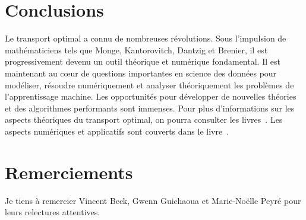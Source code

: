 \section*{Conclusions}

Le transport optimal a connu de nombreuses révolutions. Sous l'impulsion de mathématiciens tels que Monge, Kantorovitch, Dantzig et Brenier, il est progressivement devenu un outil théorique et numérique fondamental. 
%
Il est maintenant au c\oe{}ur de questions importantes en science des données pour modéliser, résoudre numériquement et analyser théoriquement les problèmes de l'apprentissage machine. Les opportunités pour développer de nouvelles théories et des algorithmes performants sont immenses. 
%
Pour plus d'informations sur les aspects théoriques du transport optimal, on pourra consulter les livres~\cite{Villani03,SantambrogioBook}. Les aspects numériques et applicatifs sont couverts dans le livre~\cite{PeyreCuturi}.


\section*{Remerciements}

Je tiens à remercier Vincent Beck, Gwenn Guichaoua et Marie-Noëlle Peyré pour leurs relectures attentives. 


